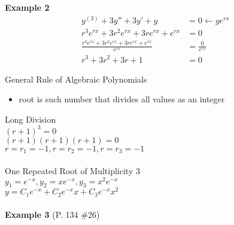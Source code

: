 \documentclass[10pt, letterpaper]{article}
\begin{document}
\textbf{Example 2}
\begin{align*}
y^{(3)} +3y'' +3y' +y &= 0 \leftarrow ye^{rx}\\
r^3e^{rx} +3r^2e^{rx} +3re^{rx} +e^{rx} &= 0\\
\frac{r^3e^{rx} +3r^2e^{rx} +3re^{rx} +e^{rx}}{e^{rx}} &= \frac{0}{e^{rx}}\\
r^3 +3r^2 +3r +1 &= 0
\end{align*}

General Rule of Algebraic Polynomials
\begin{itemize}
	\item root is such number that divides all values as an integer
\end{itemize}

Long Division\\
$(r+1)^3=0$\\
$(r+1)(r+1)(r+1)=0$\\
$r=r_1=-1, r=r_2=-1, r=r_3=-1$\\
\\
One Repeated Root of Multiplicity 3\\
$y_1=e^{-x}, y_2=xe^{-x}, y_3=x^2e^{-x}$\\
$y=C_1e^{-x} +C_2e^{-x}x +C_3e^{-x}x^2$\\
\\
\textbf{Example 3} (P. 134 \#26)\\
\end{document}
